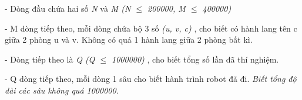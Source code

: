 - Dòng đầu chứa hai số \emph{ N } và \emph{ M (N  $\le$  200000, M  $\le$  400000) }

- M dòng tiếp theo, mỗi dòng chứa bộ 3 số \emph{ (u, v, c) } , cho biết có hành lang tên c giữa 2 phòng u và v. Không có quá 1 hành lang giữa 2 phòng bất kì.

- Dòng tiếp theo là \emph{ Q (Q  $\le$  1000000) } , cho biết tổng số lần đã thí nghiệm.

- Q dòng tiếp theo, mỗi dòng 1 sâu cho biết hành trình robot đã đi. \emph{ Biết tổng độ dài các sâu không quá 1000000. }